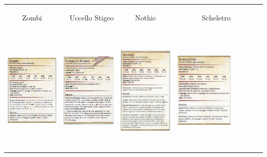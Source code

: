 \documentclass{article}
\begin{document}
\begin{table}
    \centering
      \begin{tabular}{cr|cr|cr|cr}
            \hypertarget{zombi}{Zombi} & \hypertarget{uccello}{Uccello Stigeo}&  \hypertarget{nothic}{Nothic} & \hypertarget{scheletro}{Scheletro}\\
            \includegraphics[width=4cm,height = 6cm]{../Mostri/Zombi.png}& \includegraphics[width=4cm,height = 6cm]{../Mostri/UccelloStigeo.png}& \includegraphics[width=4cm,height = 6cm]{../Mostri/Nothic.png}&\includegraphics[width=4cm,height = 6cm]{../Mostri/Scheletro.png}\\

\end{tabular}
\end{table}
\end{document}
